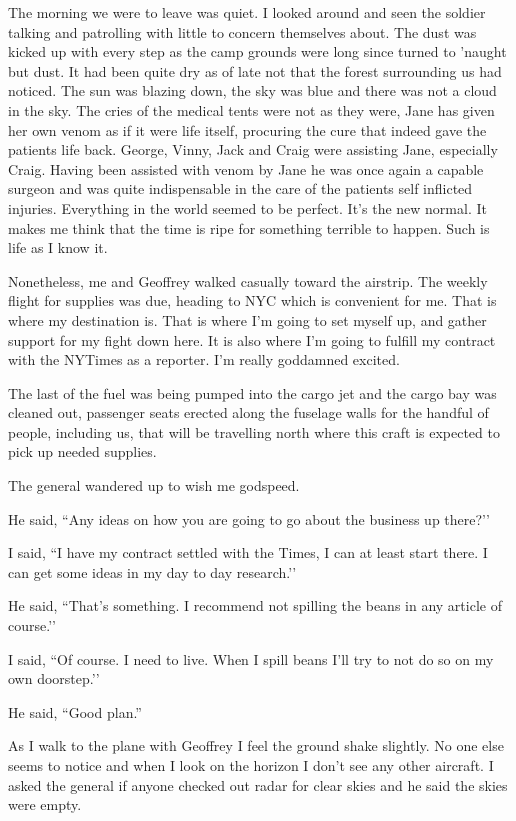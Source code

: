  The morning we were to leave was quiet. I looked around and seen the soldier talking and patrolling with little to concern themselves about. The dust was kicked up with every step as the camp grounds were long since turned to 'naught but dust. It had been quite dry as of late not that the forest surrounding us had noticed. The sun was blazing down, the sky was blue and there was not a cloud in the sky. The cries of the medical tents were not as they were, Jane has given her own venom as if it were life itself, procuring the cure that indeed gave the patients life back. George, Vinny, Jack and Craig were assisting Jane, especially Craig. Having been assisted with venom by Jane he was once again a  capable surgeon and was quite indispensable in the care of the patients self inflicted injuries. Everything in the world seemed to be perfect. It’s the new normal. It makes me think that the time is ripe for something terrible to happen. Such is life as I know it.
 
 Nonetheless, me and Geoffrey walked casually toward the airstrip. The weekly flight for supplies was due, heading to NYC which is convenient for me. That is where my destination is. That is where I'm going to set myself up, and gather support for my fight down here. It is also where I'm going to fulfill my contract with the NYTimes as a reporter. I'm really goddamned excited.

The last of the fuel was being pumped into the cargo jet and the cargo bay was cleaned out, passenger seats erected along the fuselage walls for the handful of people, including us, that will be travelling north where this craft is expected to pick up needed supplies.

The general wandered up to wish me godspeed.

He said, ``Any ideas on how you are going to go about the business up there?’’

I said, ``I have my contract settled with the Times, I can at least start there. I can get some ideas in my day to day research.’’

He said, ``That’s something. I recommend not spilling the beans in any article of course.’’

I said, ``Of course. I need to live. When I spill beans I’ll try to not do so on my own doorstep.’’

He said, ``Good plan.''

\parasep{}

As I walk to the plane with Geoffrey I feel the ground shake slightly. No one else seems to notice and when I look on the horizon I don't see any other aircraft. I asked the general if anyone checked out radar for clear skies and he said the skies were empty.

